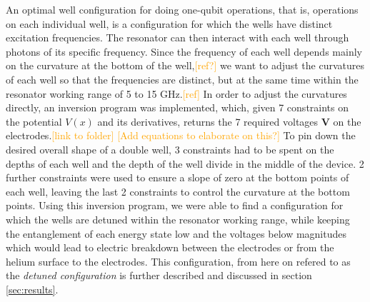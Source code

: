\documentclass[twocolumn,superscriptaddress,unsortedaddress,
 amsmath,amssymb,
 aps,
]{revtex4-2}
\newcommand{\may}[1]{\textcolor{orange}{#1}}
\begin{document}
        An optimal well configuration for doing one-qubit operations, that is, operations on each individual well, is a configuration for which the wells have distinct excitation frequencies. The resonator can then interact with each well through photons of its specific frequency. Since the frequency of each well depends mainly on the curvature at the bottom of the well,\may{[ref?]} we want to adjust the curvatures of each well so that the frequencies are distinct, but at the same time within the resonator working range of 5 to 15 GHz.\may{[ref]} In order to adjust the curvatures directly, 
        an inversion program was implemented, which, given 7 constraints on the potential $V(x)$ and its derivatives, returns the 7 required voltages $\boldsymbol{V}$ on the electrodes.\may{[link to folder]} \may{[Add equations to elaborate on this?]} To pin down the desired overall shape of a double well, 3 constraints had to be spent on the depths of each well and the depth of the well divide in the middle of the device. 2 further constraints were used to ensure a slope of zero at the bottom points of each well, leaving the last 2 constraints to control the curvature at the bottom points. Using this inversion program, we were able to find a configuration for which the wells are detuned within the resonator working range, while keeping the entanglement of each energy state low and the voltages below magnitudes which would lead to electric breakdown between the electrodes or from the helium surface to the electrodes. This configuration, from here on refered to as the \textit{detuned configuration} is further described and discussed in section \ref{sec:results}.
        
\end{document}
